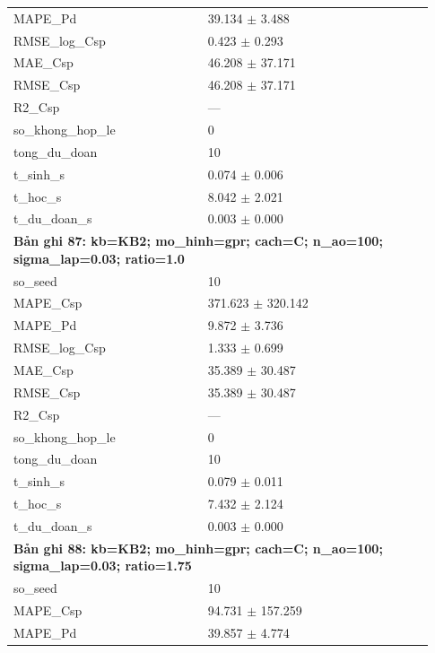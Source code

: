 \begin{longtable}{p{0.43\linewidth}p{0.50\linewidth}}
MAPE\_\allowbreak Pd & 39.134 $\pm$ 3.488 \\
RMSE\_\allowbreak log\_\allowbreak Csp & 0.423 $\pm$ 0.293 \\
MAE\_\allowbreak Csp & 46.208 $\pm$ 37.171 \\
RMSE\_\allowbreak Csp & 46.208 $\pm$ 37.171 \\
R2\_\allowbreak Csp & — \\
so\_\allowbreak khong\_\allowbreak hop\_\allowbreak le & 0 \\
tong\_\allowbreak du\_\allowbreak doan & 10 \\
t\_\allowbreak sinh\_\allowbreak s & 0.074 $\pm$ 0.006 \\
t\_\allowbreak hoc\_\allowbreak s & 8.042 $\pm$ 2.021 \\
t\_\allowbreak du\_\allowbreak doan\_\allowbreak s & 0.003 $\pm$ 0.000 \\
\midrule
\multicolumn{2}{p{0.95\linewidth}}{\textbf{Bản ghi 87: kb=KB2; mo\_hinh=gpr; cach=C; n\_ao=100; sigma\_lap=0.03; ratio=1.0}} \\
so\_\allowbreak seed & 10 \\
MAPE\_\allowbreak Csp & 371.623 $\pm$ 320.142 \\
MAPE\_\allowbreak Pd & 9.872 $\pm$ 3.736 \\
RMSE\_\allowbreak log\_\allowbreak Csp & 1.333 $\pm$ 0.699 \\
MAE\_\allowbreak Csp & 35.389 $\pm$ 30.487 \\
RMSE\_\allowbreak Csp & 35.389 $\pm$ 30.487 \\
R2\_\allowbreak Csp & — \\
so\_\allowbreak khong\_\allowbreak hop\_\allowbreak le & 0 \\
tong\_\allowbreak du\_\allowbreak doan & 10 \\
t\_\allowbreak sinh\_\allowbreak s & 0.079 $\pm$ 0.011 \\
t\_\allowbreak hoc\_\allowbreak s & 7.432 $\pm$ 2.124 \\
t\_\allowbreak du\_\allowbreak doan\_\allowbreak s & 0.003 $\pm$ 0.000 \\
\midrule
\multicolumn{2}{p{0.95\linewidth}}{\textbf{Bản ghi 88: kb=KB2; mo\_hinh=gpr; cach=C; n\_ao=100; sigma\_lap=0.03; ratio=1.75}} \\
so\_\allowbreak seed & 10 \\
MAPE\_\allowbreak Csp & 94.731 $\pm$ 157.259 \\
MAPE\_\allowbreak Pd & 39.857 $\pm$ 4.774 \\

\end{longtable}
